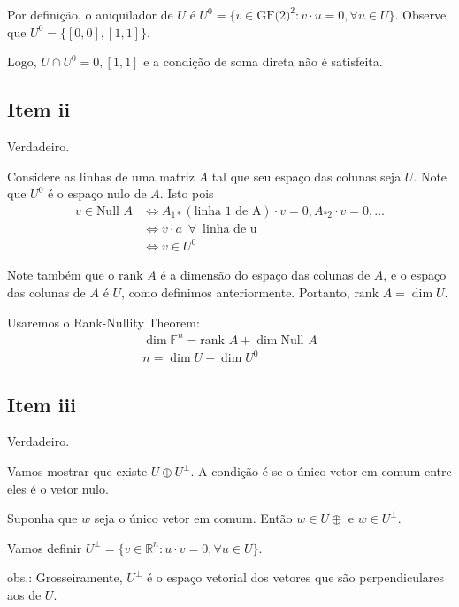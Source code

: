 \documentclass{article}
\newcommand{\F}[1]{\mathbb{F}^{#1}}
\newcommand{\Null}[1]{\textrm{Null } #1}
\newcommand{\rank}[1]{\textrm{rank } #1}
\newcommand{\GF}{\textrm{GF(2)}}
\begin{document}
Por definição, o aniquilador de $U$ é $U^0 = \{ v \in \GF^2 : v \cdot u = 0, \forall u \in U \}$.
Observe que $U^0 = \{ [0, 0], [1, 1] \}$.

Logo, $U \cap U^0 = {0, [1,1]}$ e a condição de soma direta não é satisfeita.



\subsection*{Item ii}\label{q4ii}
Verdadeiro.

Considere as linhas de uma matriz $A$ tal que seu espaço das colunas seja $U$.
Note que $U^0$ é o espaço nulo de $A$. Isto pois
\begin{align*}
    v \in \Null{A} &\iff A_{1*} (\textrm{linha 1 de A}) \cdot v = 0, A_{*2} \cdot v = 0, ... \\
    &\iff v \cdot a \,\,\, \forall \,\,\, \textrm{linha de u} \\
    &\iff v \in U^0
\end{align*}

Note também que o $\rank{A}$ é a dimensão do espaço das colunas de $A$, e o espaço das colunas de $A$ é $U$, como definimos anteriormente.
Portanto, $\rank{A} = \dim U$.

Usaremos o Rank-Nullity Theorem:
\begin{align*}
    \dim \F{n} = \rank{A} + \dim \Null{A} \\
    n = \dim U + \dim U^0
\end{align*}

\subsection*{Item iii}
Verdadeiro.

Vamos mostrar que existe $U \oplus U^\bot$.
A condição é se o único vetor em comum entre eles é o vetor nulo.

Suponha que $w$ seja o único vetor em comum. Então $w \in U \oplus$ e $w \in U^\bot$.

Vamos definir $U^\bot = \{ v \in \mathbb{R}^n : u \cdot v = 0, \forall u \in U \}$.

obs.: Grosseiramente, $U^\bot$ é o espaço vetorial dos vetores que são perpendiculares aos de $U$.
\end{document}
